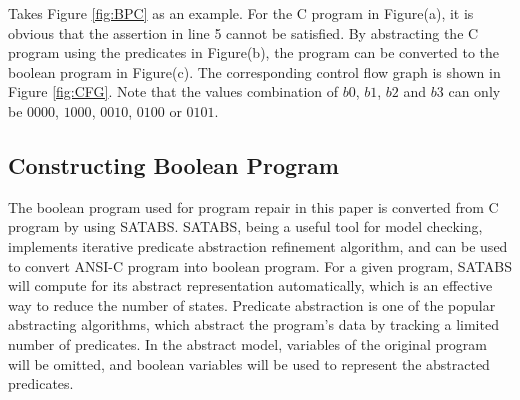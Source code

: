 \documentclass[10pt,journal,final,]{article}
\theoremstyle{definition}
\begin{document}
Takes Figure \ref{fig:BPC} as an example. For the C program in Figure(a), it is obvious that the assertion in line 5 cannot be satisfied.
By abstracting the C program using the predicates in Figure(b), the program can be converted to the boolean program in Figure(c).
The corresponding control flow graph is shown in Figure \ref{fig:CFG}. Note that the values combination of $b0$, $b1$, $b2$ and $b3$ can only be $0000$, $1000$, $0010$, $0100$ or $0101$.

\subsection{Constructing Boolean Program}
\label{section:ConstructingBooleanProgram}
The boolean program used for program repair in this paper is converted from C program by using SATABS\cite{SATABS}.
SATABS, being a useful tool for model checking, implements iterative predicate abstraction refinement algorithm\cite{CCoCaVUPAaI}, and can be used to convert ANSI-C program into boolean program.
For a given program, SATABS will compute for its abstract representation automatically, which is an effective way to reduce the number of states.
Predicate abstraction\cite{CoASGwPVS,GFSAoRSUDP} is one of the popular abstracting algorithms, which abstract the program's data by tracking a limited number of predicates.
In the abstract model, variables of the original program will be omitted, and boolean variables will be used to represent the abstracted predicates.
\end{document}
